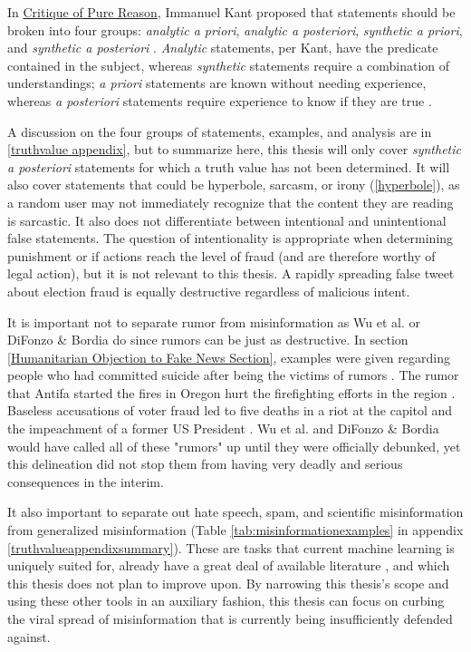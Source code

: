 \documentclass[preprint,review,12pt]{elsarticle}
\begin{document}
In \underline{Critique of Pure Reason}, Immanuel Kant proposed that statements should be broken into four groups: \textit{analytic a priori}, \textit{analytic a posteriori}, \textit{synthetic a priori}, and \textit{synthetic a posteriori} \cite{kant1908critique,frege1988collected,quine1951main}. \textit{Analytic} statements, per Kant, have the predicate contained in the subject, whereas \textit{synthetic} statements require a combination of understandings; \textit{a priori} statements are known without needing experience, whereas \textit{a posteriori} statements require experience to know if they are true \cite{wright1997companion}. 

A discussion on the four groups of statements, examples, and analysis are in \ref{truthvalue appendix}, but to summarize here, this thesis will only cover \textit{synthetic a posteriori} statements for which a truth value has not been determined. It will also cover statements that could be hyperbole, sarcasm, or irony (\ref{hyperbole}), as a random user may not immediately recognize that the content they are reading is sarcastic. It also does not differentiate between intentional and unintentional false statements. The question of intentionality is appropriate when determining punishment or if actions reach the level of fraud (and are therefore worthy of legal action), but it is not relevant to this thesis. A rapidly spreading false tweet about election fraud is equally destructive regardless of malicious intent.

It is important not to separate rumor from misinformation as Wu et al. or DiFonzo \& Bordia do since rumors can be just as destructive. In section \ref{Humanitarian Objection to Fake News Section}, examples were given regarding people who had committed suicide after being the victims of rumors \cite{starbird2014rumors,williamson2019alex}. The rumor that Antifa started the fires in Oregon hurt the firefighting efforts in the region  \cite{robinson2020oregon}. Baseless accusations of voter fraud led to five deaths in a riot at the capitol and the impeachment of a former US President \cite{fandos2021trump,Levenson2021capitol}.  Wu et al. and DiFonzo \& Bordia would have called all of these "rumors" up until they were officially debunked, yet this delineation did not stop them from having very deadly and serious consequences in the interim.

It also important to separate out hate speech, spam, and scientific misinformation from generalized misinformation (Table \ref{tab:misinformationexamples} in appendix \ref{truthvalueappendixsummary}). These are tasks that current machine learning is uniquely suited for, already have a great deal of available literature \cite{xu2019exploiting,wang2010detecting,ahmed2018detecting,al2019spam,oriola2020evaluating,gaydhani2018detecting,al2020lies,farrell2019evidence}, and which this thesis does not plan to improve upon. By narrowing this thesis's scope and using these other tools in an auxiliary fashion, this thesis can focus on curbing the viral spread of misinformation that is currently being insufficiently defended against. 
\end{document}
